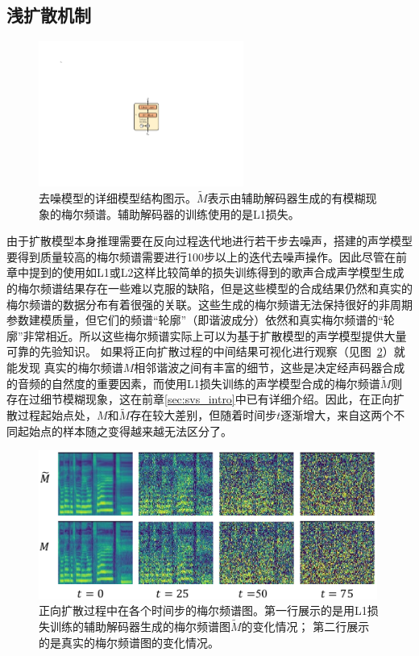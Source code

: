 \subsection{浅扩散机制}
\label{sec:shallow_mechanism}
\begin{figure}[!h]
	\centering
	\includegraphics[width=0.60\textwidth,clip=true]{figure/svs/auxiliary_decoder.pdf}
	\caption{去噪模型的详细模型结构图示。$\widetilde{M}$表示由辅助解码器生成的有模糊现象的梅尔频谱。辅助解码器的训练使用的是L1损失。}
	\label{supfig:aux_decoder}
\end{figure}
由于扩散模型本身推理需要在反向过程迭代地进行若干步去噪声，搭建的声学模型要得到质量较高的梅尔频谱需要进行100步以上的迭代去噪声操作。因此尽管在前章中提到的使用如L1或L2这样比较简单的损失训练得到的歌声合成声学模型生成的梅尔频谱结果存在一些难以克服的缺陷，但是这些模型的合成结果仍然和真实的梅尔频谱的数据分布有着很强的关联。这些生成的梅尔频谱无法保持很好的非周期参数建模质量，但它们的频谱``轮廓''（即谐波成分）依然和真实梅尔频谱的``轮廓''非常相近。所以这些梅尔频谱实际上可以为基于扩散模型的声学模型提供大量可靠的先验知识。
如果将正向扩散过程的中间结果可视化进行观察（见图~\ref{fig:fake_real_mels_diffusion}）就能发现
真实的梅尔频谱$M$相邻谐波之间有丰富的细节，这些是决定经声码器合成的音频的自然度的重要因素，而使用L1损失训练的声学模型合成的梅尔频谱$\widetilde{M}$则存在过细节模糊现象，这在前章\ref{sec:svs_intro}中已有详细介绍。因此，在正向扩散过程起始点处，$M$和$\widetilde{M}$存在较大差别，但随着时间步$t$逐渐增大，来自这两个不同起始点的样本随之变得越来越无法区分了。
\begin{figure}[!h]
    \centering
    \includegraphics[width=0.99\textwidth,]{figure/svs/fake_real_mel.pdf}
    \caption{正向扩散过程中在各个时间步的梅尔频谱图。第一行展示的是用L1损失训练的辅助解码器生成的梅尔频谱图$\widetilde{M}$的变化情况； 第二行展示的是真实的梅尔频谱图的变化情况。}
    \label{fig:fake_real_mels_diffusion}
\end{figure}

